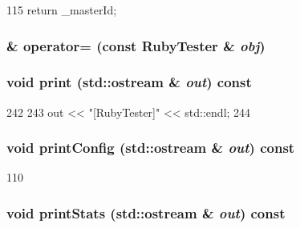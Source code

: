 \begin{DoxyCode}
115 { return _masterId; }
\end{DoxyCode}
\hypertarget{classRubyTester_a71d9335b80022b21a3a95907e238efe6}{
\subsubsection[{operator=}]{\& operator= (const {\bf RubyTester} \& {\em obj})}}
\label{classRubyTester_a71d9335b80022b21a3a95907e238efe6}
\hypertarget{classRubyTester_ac55fe386a101fbae38c716067c9966a0}{
\subsubsection[{print}]{\setlength{\rightskip}{0pt plus 5cm}void print (std::ostream \& {\em out}) const}}
\label{classRubyTester_ac55fe386a101fbae38c716067c9966a0}



\begin{DoxyCode}
242 {
243     out << "[RubyTester]" << std::endl;
244 }
\end{DoxyCode}
\hypertarget{classRubyTester_a773d0e977425600264039f8941f18496}{
\subsubsection[{printConfig}]{\setlength{\rightskip}{0pt plus 5cm}void printConfig (std::ostream \& {\em out}) const}}
\label{classRubyTester_a773d0e977425600264039f8941f18496}



\begin{DoxyCode}
110 {}
\end{DoxyCode}
\hypertarget{classRubyTester_a38f932a0a623730fe10783f46d243cef}{
\subsubsection[{printStats}]{\setlength{\rightskip}{0pt plus 5cm}void printStats (std::ostream \& {\em out}) const}}
\label{classRubyTester_a38f932a0a623730fe10783f46d243cef}




